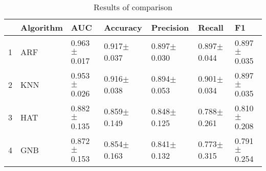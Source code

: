 \begin{table}
\footnotesize
\caption{Results of comparison}
\label{tab:comparison}
\begin{tabular}{lllllll}
\hline
 & Algorithm & AUC & Accuracy & Precision & Recall & F1 \\
\hline
1 & ARF & 0.963$\pm$0.017 & 0.917$\pm$0.037 & 0.897$\pm$0.030 & 0.897$\pm$0.044 & 0.897$\pm$0.035 \\
2 & KNN & 0.953$\pm$0.026 & 0.916$\pm$0.038 & 0.894$\pm$0.053 & 0.901$\pm$0.034 & 0.897$\pm$0.035 \\
3 & HAT & 0.882$\pm$0.135 & 0.859$\pm$0.149 & 0.848$\pm$0.125 & 0.788$\pm$0.261 & 0.810$\pm$0.208 \\
4 & GNB & 0.872$\pm$0.153 & 0.854$\pm$0.163 & 0.841$\pm$0.132 & 0.773$\pm$0.315 & 0.791$\pm$0.254 \\
\hline
\end{tabular}
\end{table}
